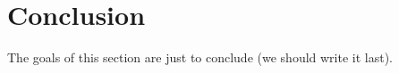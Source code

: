 \section{Conclusion}
\label{sec:conclusion}

The goals of this section are just to conclude (we should write it last).
